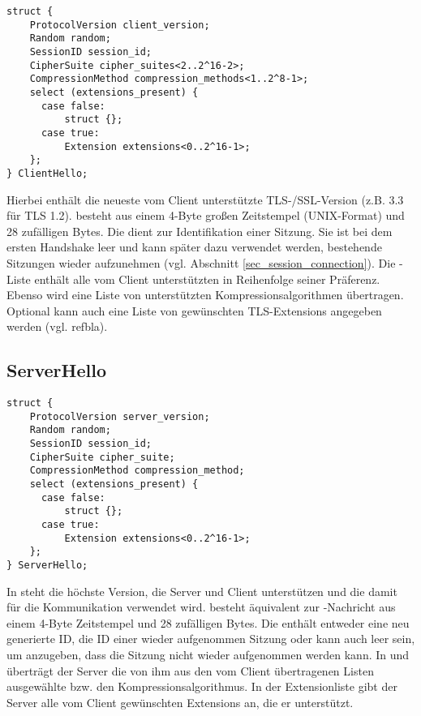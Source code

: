 \begin{lstlisting}
struct {
	ProtocolVersion client_version;
	Random random;
	SessionID session_id;
	CipherSuite cipher_suites<2..2^16-2>;
	CompressionMethod compression_methods<1..2^8-1>;
	select (extensions_present) {
	  case false:
	      struct {};
	  case true:
	      Extension extensions<0..2^16-1>;
	};
} ClientHello;
\end{lstlisting}

Hierbei enthält  die neueste vom Client unterstützte TLS-/SSL-Version (z.B. 3.3 für TLS 1.2).  besteht aus einem 4-Byte großen Zeitstempel (UNIX-Format) und 28 zufälligen Bytes. Die  dient zur Identifikation einer Sitzung. Sie ist bei dem ersten Handshake leer und kann später dazu verwendet werden, bestehende Sitzungen wieder aufzunehmen (vgl. Abschnitt \ref{sec_session_connection}). Die \ciphersuite{}-Liste enthält alle vom Client unterstützten \ciphersuites{} in Reihenfolge seiner Präferenz. Ebenso wird eine Liste von unterstützten Kompressionsalgorithmen übertragen. Optional kann auch eine Liste von gewünschten TLS-Extensions angegeben werden (vgl. refbla).

\subsection*{ServerHello}

\begin{lstlisting}
struct {
	ProtocolVersion server_version;
	Random random;
	SessionID session_id;
	CipherSuite cipher_suite;
	CompressionMethod compression_method;
	select (extensions_present) {
	  case false:
	      struct {};
	  case true:
	      Extension extensions<0..2^16-1>;
	};
} ServerHello;
\end{lstlisting}

In  steht die höchste Version, die Server und Client unterstützen und die damit für die Kommunikation verwendet wird.  besteht äquivalent zur \clienthello{}-Nachricht aus einem 4-Byte Zeitstempel und 28 zufälligen Bytes. Die  enthält entweder eine neu generierte ID, die ID einer wieder aufgenommen Sitzung oder kann auch leer sein, um anzugeben, dass die Sitzung nicht wieder aufgenommen werden kann. In  und  überträgt der Server die von ihm aus den vom Client übertragenen Listen ausgewählte \ciphersuite{} bzw. den Kompressionsalgorithmus. In der Extensionliste gibt der Server alle vom Client gewünschten Extensions an, die er unterstützt.

